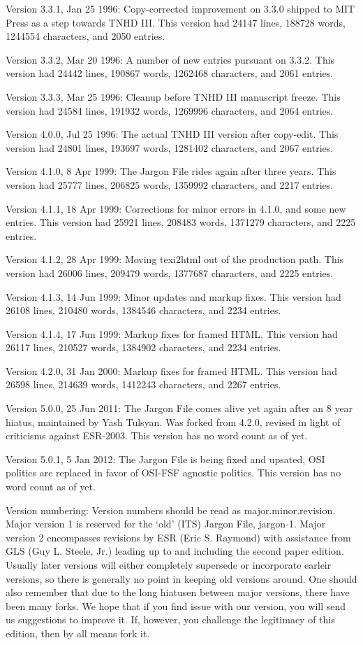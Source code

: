 Version 3.3.1, Jan 25 1996: Copy-corrected improvement on 3.3.0 shipped to MIT
Press as a step towards TNHD III. This version had 24147 lines, 188728 words,
1244554 characters, and 2050 entries.

Version 3.3.2, Mar 20 1996: A number of new entries pursuant on 3.3.2. This
version had 24442 lines, 190867 words, 1262468 characters, and 2061 entries.

Version 3.3.3, Mar 25 1996: Cleanup before TNHD III manuscript freeze. This
version had 24584 lines, 191932 words, 1269996 characters, and 2064 entries.

Version 4.0.0, Jul 25 1996: The actual TNHD III version after copy-edit. This
version had 24801 lines, 193697 words, 1281402 characters, and 2067 entries.

Version 4.1.0, 8 Apr 1999: The Jargon File rides again after three years. This
version had 25777 lines, 206825 words, 1359992 characters, and 2217 entries.

Version 4.1.1, 18 Apr 1999: Corrections for minor errors in 4.1.0, and some new
entries. This version had 25921 lines, 208483 words, 1371279 characters, and
2225 entries.

Version 4.1.2, 28 Apr 1999: Moving texi2html out of the production path. This
version had 26006 lines, 209479 words, 1377687 characters, and 2225 entries.

Version 4.1.3, 14 Jun 1999: Minor updates and markup fixes. This version had
26108 lines, 210480 words, 1384546 characters, and 2234 entries.

Version 4.1.4, 17 Jun 1999: Markup fixes for framed HTML. This version had
26117 lines, 210527 words, 1384902 characters, and 2234 entries.

Version 4.2.0, 31 Jan 2000: Markup fixes for framed HTML. This version had
26598 lines, 214639 words, 1412243 characters, and 2267 entries.

Version 5.0.0, 25 Jun 2011: The Jargon File comes alive yet again after an 8
year hiatus, maintained by Yash Tulsyan. Was forked from 4.2.0, revised in
light of criticisms against ESR-2003. This version has no word count as of yet.

Version 5.0.1, 5 Jan 2012: The Jargon File is being fixed and upsated, OSI
politics are replaced in favor of OSI-FSF agnostic politics.  This version has
no word count as of yet.

Version numbering: Version numbers should be read as major.minor.revision.
Major version 1 is reserved for the `old' (ITS) Jargon File, jargon-1. Major
version 2 encompasses revisions by ESR (Eric S. Raymond) with assistance from
GLS (Guy L. Steele, Jr.) leading up to and including the second paper edition.
Usually later versions will either completely supersede or incorporate earleir
versions, so there is generally no point in keeping old versions around. One
should also remember that due to the long hiatusen between major versions,
there have been many forks. We hope that if you find issue with our version,
you will send us suggestions to improve it. If, however, you challenge the
legitimacy of this edition, then by all means fork it.


